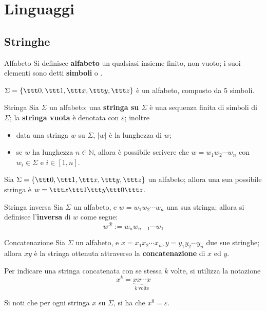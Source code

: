\documentclass[a4paper, 12pt]{report}
\begin{document}
    \section{Linguaggi}

    \subsection{Stringhe}

    \begin{frameddefn}{Alfabeto}
        Si definisce \textbf{alfabeto} un qualsiasi insieme finito, non vuoto; i suoi elementi sono detti \textbf{simboli} o .
    \end{frameddefn}

    \begin{example}[Alfabeto]
        $\Sigma = \{\ttt 0,\ttt 1,\ttt x,\ttt y,\ttt z\}$ è un alfabeto, composto da 5 simboli.
    \end{example}

    \begin{frameddefn}{Stringa}
        Sia $\Sigma$ un alfabeto; una \textbf{stringa su $\Sigma$} è una sequenza finita di simboli di $\Sigma$; la \textbf{stringa vuota} è denotata con $\varepsilon$; inoltre

        \begin{itemize}
            \item data una stringa $w$ su $\Sigma$, $|w|$ è la lunghezza di $w$;
            \item se $w$ ha lunghezza $n \in \mathbb{N}$, allora è possibile scrivere che $w = w_1 w_2 \cdots w_n$ con $w_i \in \Sigma$ e $i \in [1, n]$.
        \end{itemize}
    \end{frameddefn}

    \begin{example}[Stringa]
        Sia $\Sigma = \{\ttt 0,\ttt 1,\ttt x,\ttt y,\ttt z\}$ un alfabeto; allora una sua possibile stringa è $w = \ttt x \ttt 1 \ttt y \ttt 0 \ttt z$.
    \end{example}

    \begin{frameddefn}{Stringa inversa}
        Sia $\Sigma$ un alfabeto, e $w = w_1 w_2\cdots w_n$ una sua stringa; allora si definisce l'\textbf{inversa} di $w$ come segue: $$w^\mathcal{R} := w_n w_{n - 1}\cdots w_1$$
    \end{frameddefn}

    \begin{frameddefn}{Concatenazione}
        Sia $\Sigma$ un alfabeto, e $x = x_1 x_2 \cdots x_n, y = y_1 y_2 \cdots y_n$ due sue stringhe; allora $xy$ è la stringa ottenuta attraverso la \textbf{concatenazione} di $x$ ed $y$.

        Per indicare una stringa concatenata con se stessa $k$ volte, si utilizza la notazione $$x^k = \underbrace{xx \cdots x}_{k \ \textrm{volte}}$$

        Si noti che per ogni stringa $x$ su $\Sigma$, si ha che $x^0 = \varepsilon$.
    \end{frameddefn}
\end{document}

